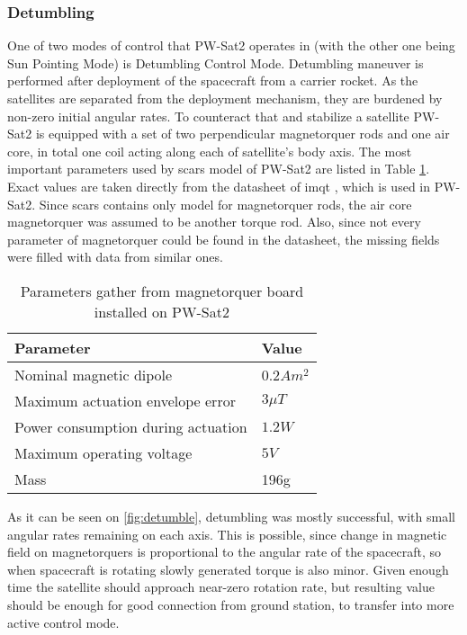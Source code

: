         \subsubsection{Detumbling}
            One of two modes of control that PW-Sat2 operates in (with the other one being Sun Pointing Mode) is Detumbling Control Mode. Detumbling maneuver is performed after deployment of the spacecraft from a carrier rocket. As the satellites are separated from the deployment mechanism, they are burdened by non-zero initial angular rates. To counteract that and stabilize a satellite PW-Sat2 is equipped with a set of two perpendicular magnetorquer rods and one air core, in total one coil acting along each of satellite's body axis. The most important parameters used by \ac{scars} model of PW-Sat2 are listed in Table \ref{table:pwsat2magne}.\cite{pwsat2adcs} Exact values are taken directly from the datasheet of \ac{imqt} \cite{imqt-datasheet}, which is used in PW-Sat2. Since \ac{scars} contains only model for magnetorquer rods, the air core magnetorquer was assumed to be another torque rod. Also, since not every parameter of magnetorquer could be found in the datasheet, the missing fields were filled with data from similar ones.

            \begin{table}
                \centering    
                \small
                \begin{tabular}{l l}
                    \textbf{Parameter} & \textbf{Value} \\ \hline
                    Nominal magnetic dipole & $0.2 Am^2$ \\
                    Maximum actuation envelope error & $3\mu T$ \\
                    Power consumption during actuation & $1.2W$ \\
                    Maximum operating voltage & $5V$ \\
                    Mass & 196g \\ \hline
                \end{tabular}
                \caption{Parameters gather from magnetorquer board installed on PW-Sat2}\label{table:pwsat2magne}
            \end{table}

            As it can be seen on \autoref{fig:detumble}, detumbling was mostly successful, with small angular rates remaining on each axis. This is possible, since change in magnetic field on magnetorquers is proportional to the angular rate of the spacecraft, so when spacecraft is rotating slowly generated torque is also minor. Given enough time the satellite should approach near-zero rotation rate, but resulting value should be enough for good connection from ground station, to transfer into more active control mode. 

